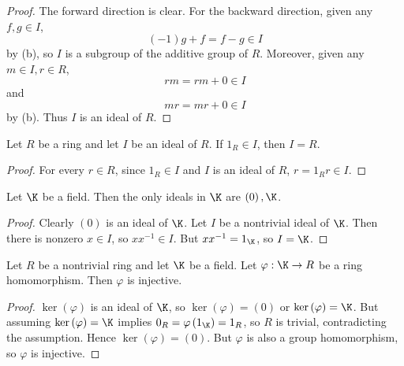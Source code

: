 \documentclass[pmath347]{subfiles}
\begin{document}
    \begin{proof}
        The forward direction is clear. For the backward direction, given any $f,g\in I$,
        \begin{equation*}
            \left( -1 \right) g + f = f-g \in I
        \end{equation*}
        by (b), so $I$ is a subgroup of the additive group of $R$. Moreover, given any $m\in I, r\in R$,
        \begin{equation*}
            rm = rm + 0 \in I
        \end{equation*}
        and
        \begin{equation*}
            mr = mr + 0 \in I
        \end{equation*}
        by (b). Thus $I$ is an ideal of $R$.
    \end{proof}
    
    \begin{prop}{}
        Let $R$ be a ring and let $I$ be an ideal of $R$. If $1_R\in I$, then $I=R$.
    \end{prop}

    \begin{proof}
        For every $r\in R$, since $1_R\in I$ and $I$ is an ideal of $R$, $r = 1_Rr \in I$.
    \end{proof}
    
    \clearpage
    \begin{cor}{}
        Let $\K$ be a field. Then the only ideals in $\K$ are $\left( 0 \right) , \K$.
    \end{cor}	

    \begin{proof}
        Clearly $\left( 0 \right)$ is an ideal of $\K$. Let $I$ be a nontrivial ideal of $\K$. Then there is nonzero $x\in I$, so $xx^{-1} \in I$. But $xx^{-1} = 1_{\K}$, so $I=\K$.
    \end{proof}
    
    \begin{cor}{}
        Let $R$ be a nontrivial ring and let $\K$ be a field. Let $\varphi:\K\to R$ be a ring homomorphism. Then $\varphi$ is injective.
    \end{cor}	

    \begin{proof}
        $\ker\left( \varphi \right)$ is an ideal of $\K$, so $\ker\left( \varphi \right) = \left( 0 \right)$ or $\ker\left( \varphi \right) = \K$. But assuming $\ker\left( \varphi \right) = \K$ implies $0_R = \varphi\left( 1_{\K} \right) = 1_R$, so $R$ is trivial, contradicting the assumption. Hence $\ker\left( \varphi \right) = \left( 0 \right)$. But $\varphi$ is also a group homomorphism, so $\varphi$ is injective.
    \end{proof}
    
\end{document}
